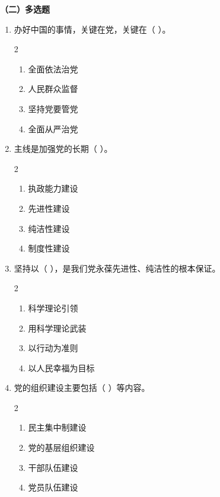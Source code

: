 \documentclass[a4paper,11pt]{ctexart}
\begin{document}
\textbf{（二）多选题}
\begin{enumerate}
    \item 办好中国的事情，关键在党，关键在（ ）。
    \begin{multicols}{2}
    \begin{enumerate}
        \item 全面依法治党
        \item 人民群众监督
        \item 坚持党要管党
        \item 全面从严治党
    \end{enumerate}
    \end{multicols}

    \item 主线是加强党的长期（ ）。
    \begin{multicols}{2}
    \begin{enumerate}
        \item 执政能力建设
        \item 先进性建设
        \item 纯洁性建设
        \item 制度性建设
    \end{enumerate}
    \end{multicols}

    \item 坚持以（ ），是我们党永葆先进性、纯洁性的根本保证。
    \begin{multicols}{2}
    \begin{enumerate}
        \item 科学理论引领
        \item 用科学理论武装
        \item 以行动为准则
        \item 以人民幸福为目标
    \end{enumerate}
    \end{multicols}

    \item 党的组织建设主要包括（ ）等内容。
    \begin{multicols}{2}
    \begin{enumerate}
        \item 民主集中制建设
        \item 党的基层组织建设
        \item 干部队伍建设
        \item 党员队伍建设
    \end{enumerate}
    \end{multicols}


\end{enumerate}
\end{document}

